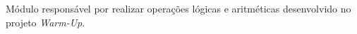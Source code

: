 \begin{dependencies}
    {Módulo responsável por realizar operações lógicas e aritméticas desenvolvido no projeto \textit{Warm-Up}.}
\end{dependencies}